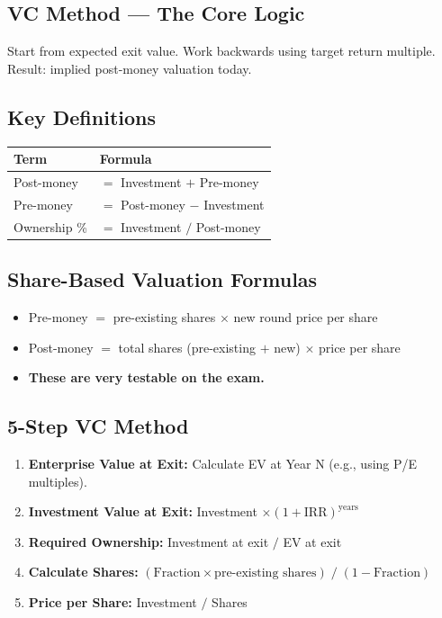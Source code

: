 \documentclass[a4paper,11pt]{article}
\begin{document}
\subsection{VC Method --- The Core Logic}

Start from expected exit value. Work backwards using target return multiple. Result: implied post-money valuation today.

\subsection{Key Definitions}

\begin{tabular}{@{}ll@{}}
\toprule
\textbf{Term} & \textbf{Formula} \\
\midrule
Post-money & $=$ Investment $+$ Pre-money \\
Pre-money & $=$ Post-money $-$ Investment \\
Ownership \% & $=$ Investment $/$ Post-money \\
\bottomrule
\end{tabular}

\subsection{Share-Based Valuation Formulas}

\begin{itemize}
\item Pre-money $=$ pre-existing shares $\times$ new round price per share
\item Post-money $=$ total shares (pre-existing $+$ new) $\times$ price per share
\item \textbf{These are very testable on the exam.}
\end{itemize}

\subsection{5-Step VC Method}

\begin{enumerate}
\item \textbf{Enterprise Value at Exit:} Calculate EV at Year N (e.g., using P/E multiples).
\item \textbf{Investment Value at Exit:} Investment $\times (1 + \text{IRR})^{\text{years}}$
\item \textbf{Required Ownership:} Investment at exit $/$ EV at exit
\item \textbf{Calculate Shares:} $(\text{Fraction} \times \text{pre-existing shares}) \;/\; (1 - \text{Fraction})$
\item \textbf{Price per Share:} Investment $/$ Shares
\end{enumerate}
\end{document}
